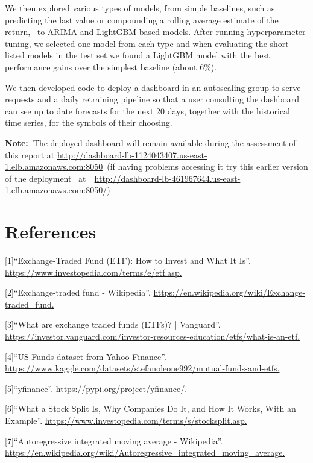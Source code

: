 \documentclass[10pt]{article}
\begin{document}
We then explored various types of models, from simple baselines, such as
predicting the last value or compounding a rolling average estimate of
the return,~ to ARIMA and LightGBM based models. After running
hyperparameter tuning, we selected one model from each type and when
evaluating the short listed models in the test set we found a LightGBM
model with the best performance gains over the simplest baseline (about
6\%).~

We then developed code to deploy a dashboard in an autoscaling group to
serve requests and a daily retraining pipeline so that a user consulting
the dashboard can see up to date forecasts for the next 20 days,
together with the historical time series, for the symbols of their
choosing.

\textbf{Note:~}The deployed dashboard will remain available during the
assessment of this report at
\url{http://dashboard-lb-1124043407.us-east-1.elb.amazonaws.com:8050}~(if
having problems accessing it try this earlier version of the deployment~
at~~\url{http://dashboard-lb-461967644.us-east-1.elb.amazonaws.com:8050/})

\par\null

\FloatBarrier
\section*{References}\sloppy
{}
\label{csl:1}[1]``{Exchange-Traded Fund (ETF): How to Invest and What It Is}''. \url{https://www.investopedia.com/terms/e/etf.asp.}

\label{csl:2}[2]``{Exchange-traded fund - Wikipedia}''. \url{https://en.wikipedia.org/wiki/Exchange-traded_fund.}

\label{csl:3}[3]``{What are exchange traded funds (ETFs)? | Vanguard}''. \url{https://investor.vanguard.com/investor-resources-education/etfs/what-is-an-etf.}

\label{csl:4}[4]``{US Funds dataset from Yahoo Finance}''. \url{https://www.kaggle.com/datasets/stefanoleone992/mutual-funds-and-etfs.}

\label{csl:5}[5]``{yfinance}''. \url{https://pypi.org/project/yfinance/.}

\label{csl:6}[6]``{What a Stock Split Is, Why Companies Do It, and How It Works, With an Example}''. \url{https://www.investopedia.com/terms/s/stocksplit.asp.}

\label{csl:7}[7]``{Autoregressive integrated moving average - Wikipedia}''. \url{https://en.wikipedia.org/wiki/Autoregressive_integrated_moving_average.}
\end{document}

